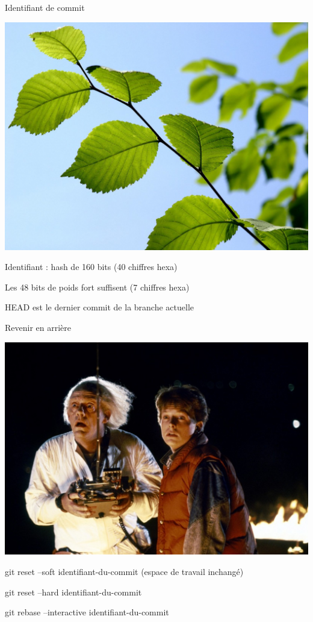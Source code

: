 \begin{frame}{Identifiant de commit}
\begin{center}
\includegraphics[scale=0.12]{feuille-arbre2.jpg}

Identifiant : hash de 160 bits (40 chiffres hexa)

Les 48 bits de poids fort suffisent (7 chiffres hexa)

HEAD est le dernier commit de la branche actuelle
\end{center}
\end{frame}

\begin{frame}{Revenir en arrière}
\begin{center}
\includegraphics[scale=0.17]{retour-vers-le-futur-85-02-g.jpg}

git reset --soft identifiant-du-commit (espace de travail inchangé)

git reset --hard identifiant-du-commit

git rebase --interactive identifiant-du-commit
\end{center}
\end{frame}

